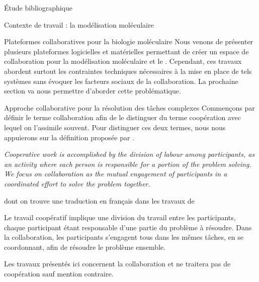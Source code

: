 \documentclass[myfrancais,ngerman,english,french]{mythesis}
\begin{document}
\begin{mychapter}{Étude bibliographique}
\begin{mysection}{Contexte de travail : la modélisation moléculaire}
\begin{mysubsection}{Plateformes collaboratives pour la biologie moléculaire}
				Nous venons de présenter plusieurs plateformes logicielles et matérielles permettant de créer un espace de collaboration pour la modélisation moléculaire et le .
				Cependant, ces travaux abordent surtout les contraintes techniques nécessaires à la mise en place de tels systèmes sans évoquer les facteurs sociaux de la collaboration.
				La prochaine section va nous permettre d'aborder cette problématique.
			\end{mysubsection}
		\end{mysection}
		\begin{mysection}{Approche collaborative pour la résolution des tâches complexes}
			Commençons par définir le terme collaboration afin de le distinguer du terme coopération avec lequel on l'assimile souvent.
			Pour distinguer ces deux termes, nous nous appuierons sur la définition proposée par .
			\begin{myquote}[english]
				\it Cooperative work is accomplished by the division of labour among participants, as an activity where each person is responsible for a portion of the problem solving.
				We focus on collaboration as the mutual engagement of participants in a coordinated effort to solve the problem together.
			\end{myquote}
			dont on trouve une traduction en français dans les travaux de 
			\begin{myquote}[french]
				Le travail coopératif implique une division du travail entre les participants, chaque participant étant responsable d’une partie du problème à résoudre.
				Dans la collaboration, les participants s’engagent tous dans les mêmes tâches, en se coordonnant, afin de résoudre le problème ensemble.
			\end{myquote}
			Les travaux présentés ici concernent la collaboration et ne traitera pas de coopération sauf mention contraire.


\end{mysection}
\end{mychapter}
\end{document}
